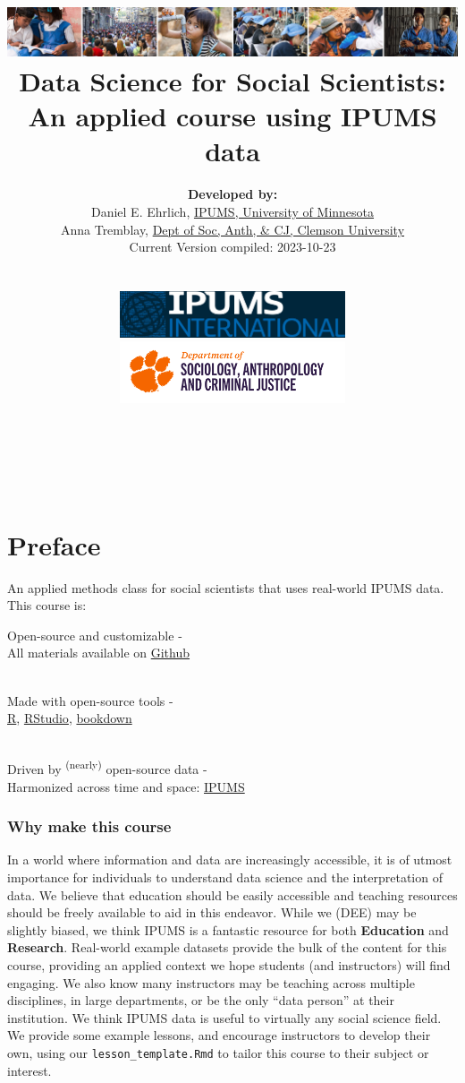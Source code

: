 \documentclass[
]{book}
\title{\includegraphics{ipums_banner.png}\\
Data Science for Social Scientists:\\
An applied course using IPUMS data }
\author{\textbf{Developed by:}\\
\hspace*{0.333em}\hspace*{0.333em}Daniel E. Ehrlich, \href{https://international.ipums.org/international/}{IPUMS, University of Minnesota}\\
\hspace*{0.333em}\hspace*{0.333em}Anna Tremblay, \href{https://www.clemson.edu/cbshs/departments/sacj/degrees/anthropology.html}{Dept of Soc, Anth, \& CJ, Clemson University}\\
\hspace*{0.333em}\hspace*{0.333em}Current Version compiled: 2023-10-23\\
\strut \\
\includegraphics[width=0.5\textwidth,height=\textheight]{ipums_i_logo.jpg}\\
\includegraphics[width=0.5\textwidth,height=\textheight]{clemson_logo.png}\\
\strut \\
\strut \\}
\date{}
\begin{document}
\maketitle

{
\setcounter{tocdepth}{1}
\tableofcontents
}
\hypertarget{preface}{%
\chapter*{Preface}\label{preface}}

An applied methods class for social scientists that uses real-world IPUMS data. This course is:

Open-source and customizable -\\
\hspace*{0.333em}\hspace*{0.333em}\hspace*{0.333em}All materials available on \href{https://github.com/ehrlichd/ipumsEDbook}{Github}\\
\strut \\
Made with open-source tools -\\
\hspace*{0.333em}\hspace*{0.333em}\href{https://cran.r-project.org/}{R}, \href{https://www.rstudio.com/products/rstudio/}{RStudio}, \href{https://bookdown.org/}{bookdown}\\
\strut \\
Driven by \textsuperscript{(nearly)} open-source data -\\
\hspace*{0.333em}\hspace*{0.333em}Harmonized across time and space: \href{https://ipums.org}{IPUMS}\\

\hypertarget{why-make-this-course}{%
\subsection*{Why make this course}\label{why-make-this-course}}

In a world where information and data are increasingly accessible, it is of utmost importance for individuals to understand data science and the interpretation of data. We believe that education should be easily accessible and teaching resources should be freely available to aid in this endeavor. While we (DEE) may be slightly biased, we think IPUMS is a fantastic resource for both \textbf{Education} and \textbf{Research}. Real-world example datasets provide the bulk of the content for this course, providing an applied context we hope students (and instructors) will find engaging. We also know many instructors may be teaching across multiple disciplines, in large departments, or be the only ``data person'' at their institution. We think IPUMS data is useful to virtually any social science field. We provide some example lessons, and encourage instructors to develop their own, using our \texttt{lesson\_template.Rmd} to tailor this course to their subject or interest.
\end{document}
